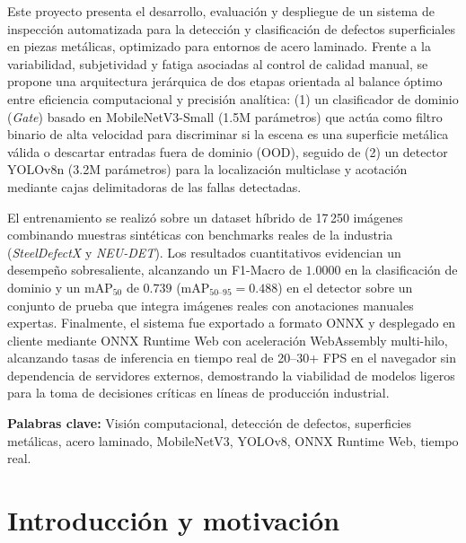 \documentclass[11pt,a4paper]{article}
\begin{document}
Este proyecto presenta el desarrollo, evaluación y despliegue de un sistema de
inspección automatizada para la detección y clasificación de defectos superficiales
en piezas metálicas, optimizado para entornos de acero laminado. Frente a la
variabilidad, subjetividad y fatiga asociadas al control de calidad manual, se
propone una arquitectura jerárquica de dos etapas orientada al balance óptimo entre
eficiencia computacional y precisión analítica: (1) un clasificador de dominio
(\emph{Gate}) basado en MobileNetV3-Small (1.5M parámetros) que actúa como filtro
binario de alta velocidad para discriminar si la escena es una superficie metálica
válida o descartar entradas fuera de dominio (OOD), seguido de (2) un detector
YOLOv8n (3.2M parámetros) para la localización multiclase y acotación mediante cajas
delimitadoras de las fallas detectadas.

El entrenamiento se realizó sobre un dataset híbrido de 17\,250 imágenes combinando
muestras sintéticas con benchmarks reales de la industria (\emph{SteelDefectX} y
\emph{NEU-DET}). Los resultados cuantitativos evidencian un desempeño sobresaliente,
alcanzando un F1-Macro de $1.0000$ en la clasificación de dominio y un $\text{mAP}_{50}$
de $0.739$ ($\text{mAP}_{50\text{--}95} = 0.488$) en el detector sobre un conjunto de
prueba que integra imágenes reales con anotaciones manuales expertas. Finalmente, el
sistema fue exportado a formato ONNX y desplegado en cliente mediante ONNX Runtime
Web con aceleración WebAssembly multi-hilo, alcanzando tasas de inferencia en tiempo
real de 20--30+ FPS en el navegador sin dependencia de servidores externos,
demostrando la viabilidad de modelos ligeros para la toma de decisiones críticas en
líneas de producción industrial.

\vspace{0.6em}
\textbf{Palabras clave:} Visión computacional, detección de defectos, superficies
metálicas, acero laminado, MobileNetV3, YOLOv8, ONNX Runtime Web, tiempo real.

\newpage

\section{Introducción y motivación}
\end{document}
